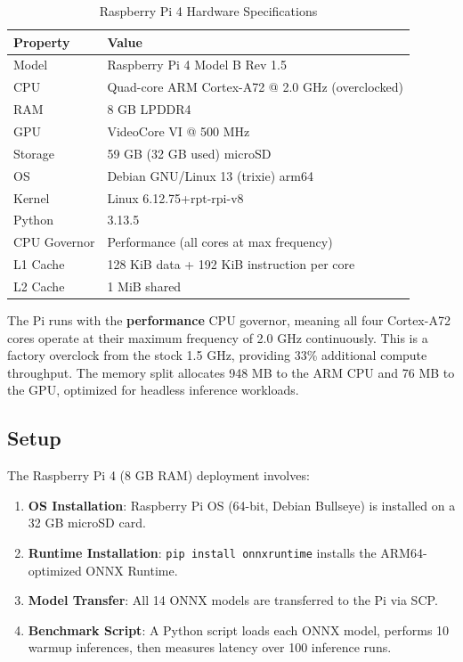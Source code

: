 \begin{table}[H]
\centering
\caption{Raspberry Pi 4 Hardware Specifications}
\label{tab:pi_specs}
\begin{tabular}{ll}
\toprule
\textbf{Property} & \textbf{Value} \\
\midrule
Model & Raspberry Pi 4 Model B Rev 1.5 \\
CPU & Quad-core ARM Cortex-A72 @ 2.0 GHz (overclocked) \\
RAM & 8 GB LPDDR4 \\
GPU & VideoCore VI @ 500 MHz \\
Storage & 59 GB (32 GB used) microSD \\
OS & Debian GNU/Linux 13 (trixie) arm64 \\
Kernel & Linux 6.12.75+rpt-rpi-v8 \\
Python & 3.13.5 \\
CPU Governor & Performance (all cores at max frequency) \\
L1 Cache & 128 KiB data + 192 KiB instruction per core \\
L2 Cache & 1 MiB shared \\
\bottomrule
\end{tabular}
\end{table}

The Pi runs with the \textbf{performance} CPU governor, meaning all four Cortex-A72 cores operate at their maximum frequency of 2.0 GHz continuously. This is a factory overclock from the stock 1.5 GHz, providing 33\% additional compute throughput. The memory split allocates 948 MB to the ARM CPU and 76 MB to the GPU, optimized for headless inference workloads.

\subsection{Setup}

The Raspberry Pi 4 (8 GB RAM) deployment involves:

\begin{enumerate}
    \item \textbf{OS Installation}: Raspberry Pi OS (64-bit, Debian Bullseye) is installed on a 32 GB microSD card.
    \item \textbf{Runtime Installation}: \texttt{pip install onnxruntime} installs the ARM64-optimized ONNX Runtime.
    \item \textbf{Model Transfer}: All 14 ONNX models are transferred to the Pi via SCP.
    \item \textbf{Benchmark Script}: A Python script loads each ONNX model, performs 10 warmup inferences, then measures latency over 100 inference runs.
\end{enumerate}


